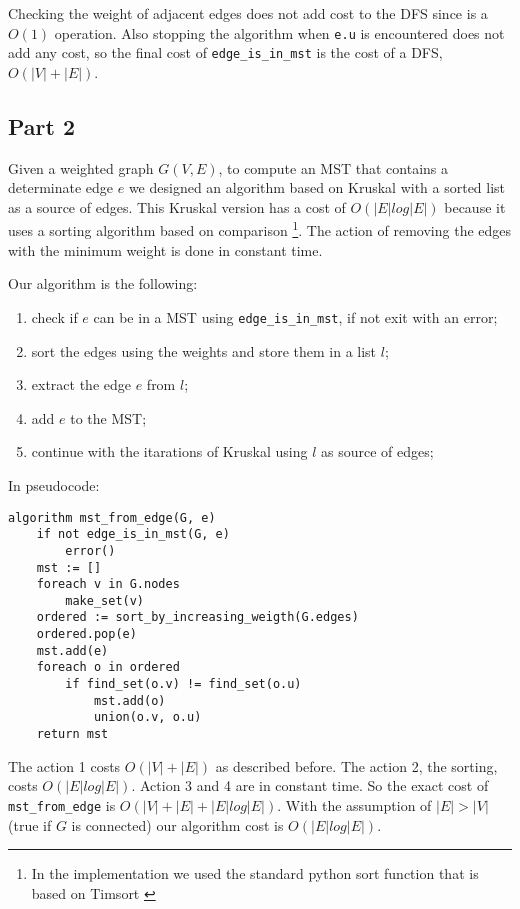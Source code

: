 \documentclass[paper=a4, fontsize=11pt]{scrartcl} %
\numberwithin{equation}{section} %
\numberwithin{figure}{section} %
\numberwithin{table}{section} %
\begin{document}
Checking the weight of adjacent edges does not add cost to the DFS since is a $O(1)$ operation. Also stopping the algorithm when \verb|e.u| is encountered does not add any cost, so the final cost of \verb|edge_is_in_mst| is the cost of a DFS, $O(|V|+|E|)$.

\subsection*{Part 2}

Given a weighted graph $G(V, E)$, to compute an MST that contains a determinate edge $e$ we designed an algorithm based on Kruskal with a sorted list as a source of edges.
This Kruskal version has a cost of $O(|E|log|E|)$ because it uses a sorting algorithm based on comparison \footnote{In the implementation we used the standard python sort function that is based on Timsort \cite{timsort}}. The action of removing the edges with the minimum weight is done in constant time.

Our algorithm is the following:

\begin{enumerate}
    \item check if $e$ can be in a MST using \verb|edge_is_in_mst|, if not exit with an error;
    \item sort the edges using the weights and store them in a list $l$;
    \item extract the edge $e$ from $l$;
    \item add $e$ to the MST;
    \item continue with the itarations of Kruskal using $l$ as source of edges;
\end{enumerate}

In pseudocode:

\begin{verbatim}
algorithm mst_from_edge(G, e)
    if not edge_is_in_mst(G, e)
        error()
    mst := []
    foreach v in G.nodes
        make_set(v)
    ordered := sort_by_increasing_weigth(G.edges)
    ordered.pop(e)
    mst.add(e)
    foreach o in ordered
        if find_set(o.v) != find_set(o.u)
            mst.add(o)
            union(o.v, o.u)
    return mst
\end{verbatim}

The action 1 costs $O(|V|+|E|)$ as described before.
The action 2, the sorting, costs $O(|E|log|E|)$.
Action 3 and 4 are in constant time.
So the exact cost of \verb|mst_from_edge| is $O(|V|+|E| + |E|log|E|)$.
With the assumption of $|E| > |V|$ (true if $G$ is connected)  our algorithm cost is $O(|E|log|E|)$.
\end{document}
